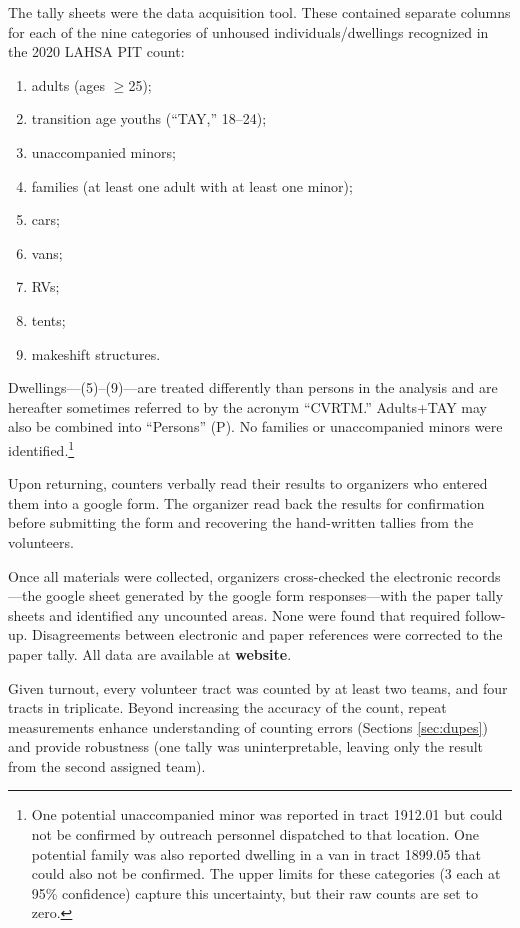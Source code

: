 \documentclass[11pt,twocolumn]{article}
\def\bfr{\bf\color{red}}
\begin{document}
The tally sheets were the data acquisition tool. These contained separate columns for each of the 
nine categories of unhoused individuals/dwellings recognized in the 2020 LAHSA PIT count: 
\begin{enumerate}
	\item adults (ages $\geq$25);
	\item transition age youths (``TAY,'' 18--24);
	\item unaccompanied minors;
	\item families (at least one adult with at least one minor); 
	\item cars;
	\item vans;
	\item RVs;
	\item tents;
	\item makeshift structures.
\end{enumerate}
Dwellings---(5)--(9)---are treated differently than persons in the analysis and are hereafter sometimes
referred to by the acronym ``CVRTM.'' Adults+TAY may also be combined into ``Persons'' (P). 
No families or unaccompanied minors were identified.\footnote{
One potential unaccompanied minor was reported in tract 1912.01 but could not be confirmed by outreach
personnel dispatched to that location. One potential family was also reported dwelling in a van in
tract 1899.05 that could also not be confirmed. The upper limits for these categories (3 each at 95\%
confidence) capture this uncertainty, but their raw counts are set to zero.}

Upon returning, counters verbally read their results to organizers who entered them into a google 
form. The organizer read back the results for confirmation before submitting the form and recovering the
hand-written tallies from the volunteers. 

Once all materials were collected, organizers cross-checked the electronic records---the
google sheet generated by the google form responses---with the paper tally sheets and 
identified any uncounted areas. None were found that required follow-up. Disagreements 
between electronic and paper references were corrected to the paper tally. All 
data are available at {\bfr website}.

Given turnout, every volunteer tract was counted by at least two teams, and four tracts in triplicate. 
Beyond increasing the accuracy of the count, repeat measurements enhance understanding of 
counting errors (Sections \ref{sec:dupes}) and provide robustness (one tally was uninterpretable, 
leaving only the result from the second assigned team).
\end{document}
